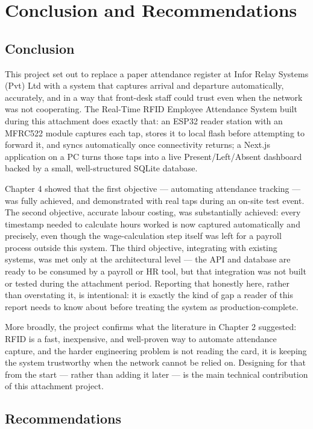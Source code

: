 \chapter{Conclusion and Recommendations}
\label{ch:conclusion}

\section{Conclusion}

This project set out to replace a paper attendance register at Infor Relay Systems (Pvt) Ltd with a system that captures arrival and departure automatically, accurately, and in a way that front-desk staff could trust even when the network was not cooperating. The Real-Time RFID Employee Attendance System built during this attachment does exactly that: an ESP32 reader station with an MFRC522 module captures each tap, stores it to local flash before attempting to forward it, and syncs automatically once connectivity returns; a Next.js application on a PC turns those taps into a live Present/Left/Absent dashboard backed by a small, well-structured SQLite database.

Chapter 4 showed that the first objective — automating attendance tracking — was fully achieved, and demonstrated with real taps during an on-site test event. The second objective, accurate labour costing, was substantially achieved: every timestamp needed to calculate hours worked is now captured automatically and precisely, even though the wage-calculation step itself was left for a payroll process outside this system. The third objective, integrating with existing systems, was met only at the architectural level — the API and database are ready to be consumed by a payroll or HR tool, but that integration was not built or tested during the attachment period. Reporting that honestly here, rather than overstating it, is intentional: it is exactly the kind of gap a reader of this report needs to know about before treating the system as production-complete.

More broadly, the project confirms what the literature in Chapter 2 suggested: RFID is a fast, inexpensive, and well-proven way to automate attendance capture, and the harder engineering problem is not reading the card, it is keeping the system trustworthy when the network cannot be relied on. Designing for that from the start — rather than adding it later — is the main technical contribution of this attachment project.

\section{Recommendations}

